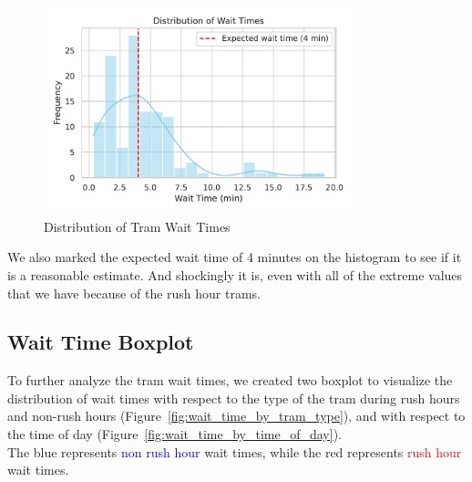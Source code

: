 \documentclass[a4paper, 10pt]{article}
\begin{document}
				\begin{figure}[h!]
					\centering
					\includegraphics[width=0.8\textwidth]{Plot_DistributionOfWaitTimes.pdf}
					\caption{Distribution of Tram Wait Times}
					\label{fig:wait_time_distribution}
				\end{figure}

				\noindent We also marked the expected wait time of 4 minutes on the histogram to see if it is a reasonable estimate.
				And shockingly it is, even with all of the extreme values that we have because of the rush hour trams. \\
			
				\newpage

		\subsection{Wait Time Boxplot}
				To further analyze the tram wait times, we created two boxplot to visualize the distribution of wait times with respect
				to the type of the tram during rush hours and non-rush hours (Figure~\ref{fig:wait_time_by_tram_type}), 
				and with respect to the time of day (Figure~\ref{fig:wait_time_by_time_of_day}). \\

				\noindent The blue represents \textcolor{blue}{non rush hour} wait times, while the red 
				represents \textcolor{red}{rush hour} wait times.
\end{document}

